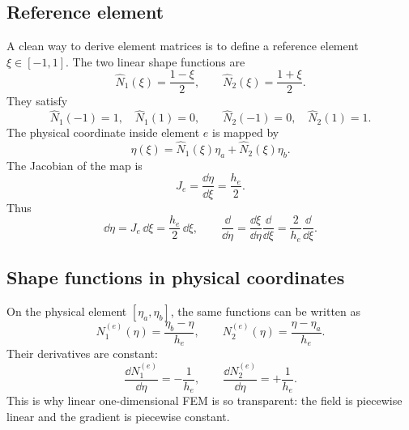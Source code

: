 \documentclass[11pt]{article}
\begin{document}
\subsection{Reference element}
A clean way to derive element matrices is to define a reference element \(\xi\in[-1,1]\). The two linear shape functions are
\begin{equation}
    \widehat N_1(\xi)=\frac{1-\xi}{2},
    \qquad
    \widehat N_2(\xi)=\frac{1+\xi}{2}.
    \label{eq:linear_shape_reference}
\end{equation}
They satisfy
\begin{equation}
    \widehat N_1(-1)=1,
    \quad
    \widehat N_1(1)=0,
    \qquad
    \widehat N_2(-1)=0,
    \quad
    \widehat N_2(1)=1.
\end{equation}
The physical coordinate inside element \(e\) is mapped by
\begin{equation}
    \eta(\xi)=\widehat N_1(\xi)\eta_a+\widehat N_2(\xi)\eta_b.
\end{equation}
The Jacobian of the map is
\begin{equation}
    J_e=\frac{\dd\eta}{\dd\xi}=\frac{h_e}{2}.
\end{equation}
Thus
\begin{equation}
    \dd\eta=J_e\,\dd\xi=\frac{h_e}{2}\,\dd\xi,
    \qquad
    \frac{\dd}{\dd\eta}=\frac{\dd\xi}{\dd\eta}\frac{\dd}{\dd\xi}=\frac{2}{h_e}\frac{\dd}{\dd\xi}.
\end{equation}

\subsection{Shape functions in physical coordinates}
On the physical element \([\eta_a,\eta_b]\), the same functions can be written as
\begin{equation}
    N_1^{(e)}(\eta)=\frac{\eta_b-\eta}{h_e},
    \qquad
    N_2^{(e)}(\eta)=\frac{\eta-\eta_a}{h_e}.
    \label{eq:linear_shape_physical}
\end{equation}
Their derivatives are constant:
\begin{equation}
    \frac{\dd N_1^{(e)}}{\dd\eta}=-\frac{1}{h_e},
    \qquad
    \frac{\dd N_2^{(e)}}{\dd\eta}=+\frac{1}{h_e}.
    \label{eq:linear_shape_derivatives}
\end{equation}
This is why linear one-dimensional FEM is so transparent: the field is piecewise linear and the gradient is piecewise constant.
\end{document}
